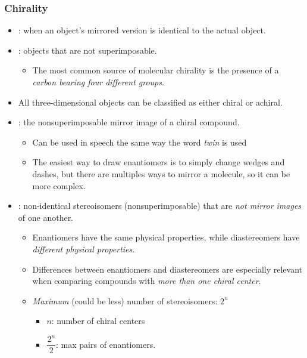 \documentclass{inVerba-notes}
\begin{document}
\begin{itemize}
  \subsubsection{Chirality}\label{Chirality}
  \begin{itemize}
    \item {}: when an object's mirrored version is identical to the actual object.
    \item {}: objects that are not superimposable.
      \begin{itemize}
        \item The most common source of molecular chirality is the presence of a \emph{carbon bearing four different groups}.
      \end{itemize}
    \item All three-dimensional objects can be classified as either chiral or achiral.
    \item {}: the nonsuperimposable mirror image of a chiral compound.
      \begin{itemize}
          \item Can be used in speech the same way the word \emph{twin} is used
          \item The easiest way to draw enantiomers is to simply change wedges and dashes, but there are multiples ways to mirror a molecule, so it can be more complex.
      \end{itemize}
    \item {}: non-identical stereoisomers (nonsuperimposable) that are \emph{not mirror images} of one another. 
      \begin{itemize}
          \item  Enantiomers have the same physical properties, while diastereomers have \emph{different physical properties}.
          \item Differences between enantiomers and diastereomers are especially relevant when comparing compounds with \emph{more than one chiral center}.
          \item \emph{Maximum} (could be less) number of stereoisomers: \emph{\(2^n\)}
        \begin{itemize}
          \item \(n\): number of chiral centers
          \item \(\dfrac{2^n}{2}\): max pairs of enantiomers.
        \end{itemize}
      \end{itemize}
    \end{itemize}


\end{itemize}
\end{document}
